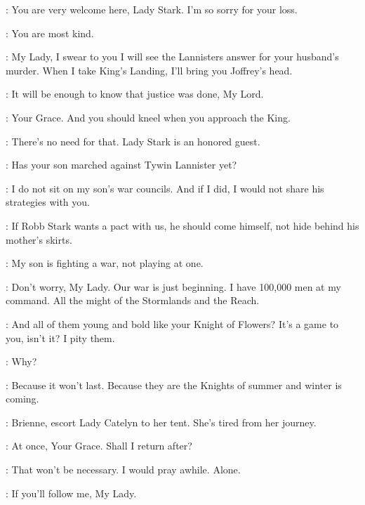 \MARGAERY: You are very welcome here, Lady Stark. I'm so sorry for your loss. 

\CATELYN: You are most kind. 

\RENLY: My Lady, I swear to you I will see the Lannisters answer for your husband's murder. When I take King's Landing, I'll bring you Joffrey's head. 


\CATELYN: It will be enough to know that justice was done, My Lord. 

\BRIENNE: Your Grace. And you should kneel when you approach the King. 

\RENLY: There's no need for that. Lady Stark is an honored guest. 

\LORAS: Has your son marched against Tywin Lannister yet? 

\CATELYN: I do not sit on my son's war councils. And if I did, I would not share his strategies with you. 

\LORAS: If Robb Stark wants a pact with us, he should come himself, not hide behind his mother's skirts. 

\CATELYN: My son is fighting a war, not playing at one. 



\RENLY: Don't worry, My Lady. Our war is just beginning. I have 100,000 men at my command. All the might of the Stormlands and the Reach. 

\CATELYN: And all of them young and bold like your Knight of Flowers? It's a game to you, isn't it? I pity them. 

\RENLY: Why? 

\CATELYN: Because it won't last. Because they are the Knights of summer and winter is coming. 

\RENLY: Brienne, escort Lady Catelyn to her tent. She's tired from her journey. 

\BRIENNE: At once, Your Grace. Shall I return after? 

\RENLY: That won't be necessary. I would pray awhile. Alone. 

\BRIENNE: If you'll follow me, My Lady. 


